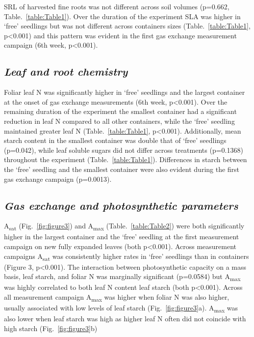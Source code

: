\documentclass[a4paper]{article}\usepackage[]{graphicx}\usepackage[]{color}
\begin{document}
SRL of harvested fine roots was not different across soil volumes (p=0.662, Table.~\ref{table:Table1}). Over the duration of the experiment SLA was higher in ‘free’ seedlings but was not different across containers sizes (Table.~\ref{table:Table1}, p\textless0.001) and this pattern was evident in the first gas exchange measurement campaign (6th week, p\textless0.001).

\subsection*{\textit{Leaf and root chemistry}}
Foliar leaf N was significantly higher in ‘free’ seedlings and the largest container at the onset of gas exchange measurements (6th week, p\textless0.001).  Over the remaining duration of the experiment the smallest container had a significant reduction in leaf N compared to all other containers, while the ‘free’ seedling maintained greater leaf N (Table.~\ref{table:Table1}, p\textless0.001).  Additionally, mean starch content in the smallest container was double that of ‘free’ seedlings (p=0.042), while leaf soluble sugars did not differ across treatments (p=0.1368) throughout the experiment (Table.~\ref{table:Table1}).  Differences in starch between the ‘free’ seedling and the smallest container were also evident during the first gas exchange campaign (p=0.0013). 

\subsection*{\textit{Gas exchange and photosynthetic parameters}}
A\textsubscript{sat} (Fig.~\ref{fig:figure3}) and A\textsubscript{max} (Table.~\ref{table:Table2}) were both significantly higher in the largest container and the ‘free’ seedling at the first measurement campaign on new fully expanded leaves (both p\textless0.001). Across measurement campaigns A\textsubscript{sat} was consistently higher rates in ‘free’ seedlings than in containers (Figure 3, p\textless0.001). The interaction between photosynthetic capacity on a mass basis, leaf starch, and foliar N was marginally significant (p=0.0584) but A\textsubscript{max} was highly correlated to both leaf N content leaf starch (both p\textless0.001). Across all measurement campaign A\textsubscript{max} was higher when foliar N was also higher, usually associated with low levels of leaf starch (Fig.~\ref{fig:figure3}a). A\textsubscript{max} was also lower when leaf starch was high as higher leaf N often did not coincide with high starch (Fig.~\ref{fig:figure3}b)
\end{document}
